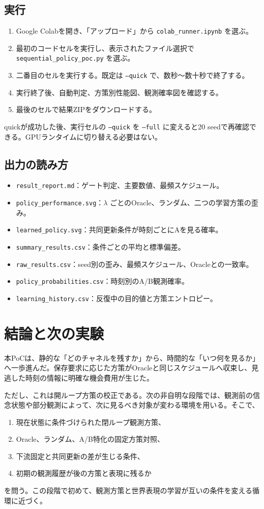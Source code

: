 \documentclass[11pt,a4paper]{ltjsarticle}
\newcommand{\code}[1]{\texttt{#1}}
\begin{document}
\subsection{実行}
\begin{enumerate}
\item Google Colabを開き、「アップロード」から \code{colab\_runner.ipynb} を選ぶ。
\item 最初のコードセルを実行し、表示されたファイル選択で \code{sequential\_policy\_poc.py} を選ぶ。
\item 二番目のセルを実行する。既定は \code{--quick} で、数秒〜数十秒で終了する。
\item 実行終了後、自動判定、方策別性能図、観測確率図を確認する。
\item 最後のセルで結果ZIPをダウンロードする。
\end{enumerate}

quickが成功した後、実行セルの \code{--quick} を \code{--full} に変えると20 seedで再確認できる。GPUランタイムに切り替える必要はない。

\subsection{出力の読み方}
\begin{itemize}
\item \code{result\_report.md}：ゲート判定、主要数値、最頻スケジュール。
\item \code{policy\_performance.svg}：$\lambda$ ごとのOracle、ランダム、二つの学習方策の歪み。
\item \code{learned\_policy.svg}：共同更新条件が時刻ごとにAを見る確率。
\item \code{summary\_results.csv}：条件ごとの平均と標準偏差。
\item \code{raw\_results.csv}：seed別の歪み、最頻スケジュール、Oracleとの一致率。
\item \code{policy\_probabilities.csv}：時刻別のA/B観測確率。
\item \code{learning\_history.csv}：反復中の目的値と方策エントロピー。
\end{itemize}

\section{結論と次の実験}

本PoCは、静的な「どのチャネルを残すか」から、時間的な「いつ何を見るか」へ一歩進んだ。保存要求に応じた方策がOracleと同じスケジュールへ収束し、見逃した時刻の情報に明確な機会費用が生じた。

ただし、これは開ループ方策の校正である。次の非自明な段階では、観測前の信念状態や部分観測によって、次に見るべき対象が変わる環境を用いる。そこで、
\begin{enumerate}
\item 現在状態に条件づけられた閉ループ観測方策、
\item Oracle、ランダム、A/B特化の固定方策対照、
\item 下流固定と共同更新の差が生じる条件、
\item 初期の観測履歴が後の方策と表現に残るか
\end{enumerate}
を問う。この段階で初めて、観測方策と世界表現の学習が互いの条件を変える循環に近づく。
\end{document}
